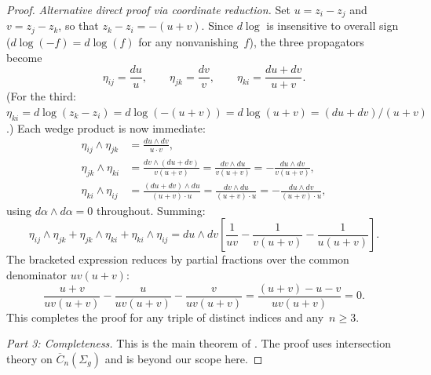 \begin{proof}
\emph{Alternative direct proof via coordinate reduction.}  Set $u = z_i - z_j$ and $v = z_j - z_k$, so that $z_k - z_i = -(u+v)$.  Since $d\log$ is insensitive to overall sign ($d\log(-f) = d\log(f)$ for any nonvanishing~$f$), the three propagators become
\[
\eta_{ij} = \frac{du}{u}, \qquad \eta_{jk} = \frac{dv}{v}, \qquad \eta_{ki} = \frac{du + dv}{u + v}.
\]
(For the third: $\eta_{ki} = d\log(z_k - z_i) = d\log(-(u+v)) = d\log(u+v) = (du+dv)/(u+v)$.)  Each wedge product is now immediate:
\begin{align*}
\eta_{ij} \wedge \eta_{jk} &= \frac{du \wedge dv}{u \cdot v}, \\[4pt]
\eta_{jk} \wedge \eta_{ki} &= \frac{dv \wedge (du + dv)}{v(u+v)} = \frac{dv \wedge du}{v(u+v)} = -\frac{du \wedge dv}{v(u+v)}, \\[4pt]
\eta_{ki} \wedge \eta_{ij} &= \frac{(du+dv) \wedge du}{(u+v) \cdot u} = \frac{dv \wedge du}{(u+v) \cdot u} = -\frac{du \wedge dv}{(u+v) \cdot u},
\end{align*}
using $d\alpha \wedge d\alpha = 0$ throughout.  Summing:
\[
\eta_{ij} \wedge \eta_{jk} + \eta_{jk} \wedge \eta_{ki} + \eta_{ki} \wedge \eta_{ij}
= du \wedge dv \left[\frac{1}{uv} - \frac{1}{v(u+v)} - \frac{1}{u(u+v)}\right].
\]
The bracketed expression reduces by partial fractions over the common denominator $uv(u+v)$:
\[
\frac{u+v}{uv(u+v)} - \frac{u}{uv(u+v)} - \frac{v}{uv(u+v)} = \frac{(u+v) - u - v}{uv(u+v)} = 0.
\]
This completes the proof for any triple of distinct indices and any~$n \geq 3$.

\emph{Part 3: Completeness.}
This is the main theorem of \cite{Arnold69, FM94}. The proof uses intersection theory on $\overline{C}_n(\Sigma_g)$ and is beyond our scope here.
\end{proof}

